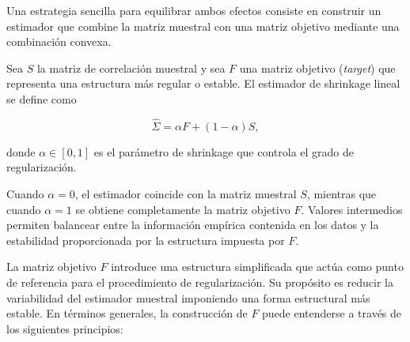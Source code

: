 \documentclass[letterpaper,12pt,oneside]{book}
\begin{document}
Una estrategia sencilla para equilibrar ambos efectos consiste en construir un estimador que combine la matriz muestral con una matriz objetivo mediante una combinación convexa.

Sea $S$ la matriz de correlación muestral y sea $F$ una matriz objetivo (\textit{target}) que representa una estructura más regular o estable. El estimador de shrinkage lineal se define como

\[
\hat{\Sigma} = \alpha F + (1-\alpha) S,
\]

donde $\alpha \in [0,1]$ es el parámetro de shrinkage que controla el grado de regularización.

Cuando $\alpha = 0$, el estimador coincide con la matriz muestral $S$, mientras que cuando $\alpha = 1$ se obtiene completamente la matriz objetivo $F$. Valores intermedios permiten balancear entre la información empírica contenida en los datos y la estabilidad proporcionada por la estructura impuesta por $F$.

La matriz objetivo $F$ introduce una estructura simplificada que actúa como punto de referencia para el procedimiento de regularización. Su propósito es reducir la variabilidad del estimador muestral imponiendo una forma estructural más estable. En términos generales, la construcción de $F$ puede entenderse a través de los siguientes principios:
\end{document}
